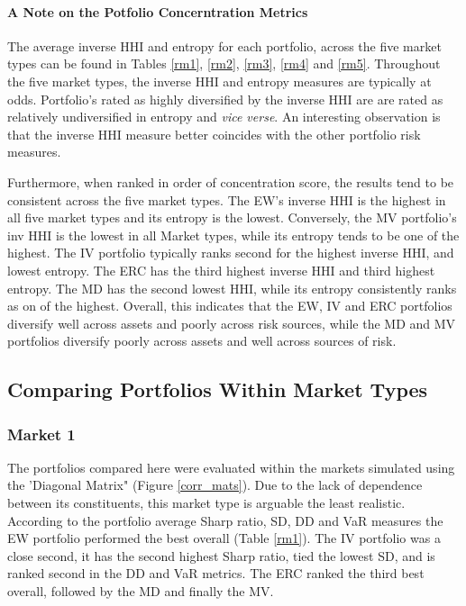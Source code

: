\documentclass[11pt,preprint, authoryear]{elsarticle}
\numberwithin{equation}{section}
\numberwithin{figure}{section}
\numberwithin{table}{section}
\begin{document}
\hypertarget{a-note-on-the-potfolio-concerntration-metrics}{%
\paragraph{A Note on the Potfolio Concerntration
Metrics}\label{a-note-on-the-potfolio-concerntration-metrics}}

The average inverse HHI and entropy for each portfolio, across the five
market types can be found in Tables \ref{rm1}, \ref{rm2}, \ref{rm3},
\ref{rm4} and \ref{rm5}. Throughout the five market types, the inverse
HHI and entropy measures are typically at odds. Portfolio's rated as
highly diversified by the inverse HHI are are rated as relatively
undiversified in entropy and \emph{vice verse}. An interesting
observation is that the inverse HHI measure better coincides with the
other portfolio risk measures.

Furthermore, when ranked in order of concentration score, the results
tend to be consistent across the five market types. The EW's inverse HHI
is the highest in all five market types and its entropy is the lowest.
Conversely, the MV portfolio's inv HHI is the lowest in all Market
types, while its entropy tends to be one of the highest. The IV
portfolio typically ranks second for the highest inverse HHI, and lowest
entropy. The ERC has the third highest inverse HHI and third highest
entropy. The MD has the second lowest HHI, while its entropy
consistently ranks as on of the highest. Overall, this indicates that
the EW, IV and ERC portfolios diversify well across assets and poorly
across risk sources, while the MD and MV portfolios diversify poorly
across assets and well across sources of risk.

\hypertarget{comparing-portfolios-within-market-types}{%
\subsection{\texorpdfstring{Comparing Portfolios Within Market Types
\label{within-market}}{Comparing Portfolios Within Market Types }}\label{comparing-portfolios-within-market-types}}

\hypertarget{market-1}{%
\subsubsection{Market 1}\label{market-1}}

The portfolios compared here were evaluated within the markets simulated
using the 'Diagonal Matrix" (Figure \ref{corr_mats}). Due to the lack of
dependence between its constituents, this market type is arguable the
least realistic. According to the portfolio average Sharp ratio, SD, DD
and VaR measures the EW portfolio performed the best overall (Table
\ref{rm1}). The IV portfolio was a close second, it has the second
highest Sharp ratio, tied the lowest SD, and is ranked second in the DD
and VaR metrics. The ERC ranked the third best overall, followed by the
MD and finally the MV.
\end{document}
